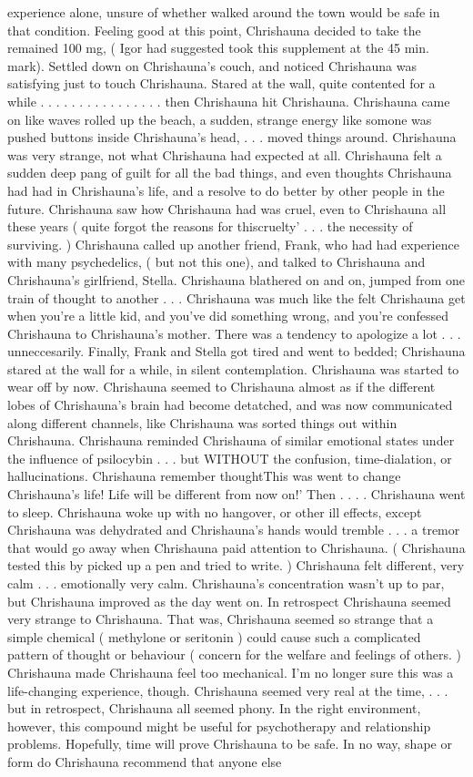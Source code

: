 \documentclass[12pt]{book}
\begin{document}
experience alone, unsure of whether walked around the town would be safe in that condition. Feeling good at this point, Chrishauna decided to take the remained 100 mg, ( Igor had suggested took this supplement at the 45 min. mark). Settled down on Chrishauna's couch, and noticed Chrishauna was satisfying just to touch Chrishauna. Stared at the wall, quite contented for a while . . .   . . .   . . .   . . .   . . .  . then Chrishauna hit Chrishauna. Chrishauna came on like waves rolled up the beach, a sudden, strange energy like somone was pushed buttons inside Chrishauna's head, . . .  moved things around. Chrishauna was very strange, not what Chrishauna had expected at all. Chrishauna felt a sudden deep pang of guilt for all the bad things, and even thoughts Chrishauna had had in Chrishauna's life, and a resolve to do better by other people in the future. Chrishauna saw how Chrishauna had was cruel, even to Chrishauna all these years ( quite forgot the reasons for thiscruelty' . . .  the necessity of surviving. ) Chrishauna called up another friend, Frank, who had had experience with many psychedelics, ( but not this one), and talked to Chrishauna and Chrishauna's girlfriend, Stella. Chrishauna blathered on and on, jumped from one train of thought to another . . .  Chrishauna was much like the felt Chrishauna get when you're a little kid, and you've did something wrong, and you're confessed Chrishauna to Chrishauna's mother. There was a tendency to apologize a lot . . .  unneccesarily. Finally, Frank and Stella got tired and went to bedded; Chrishauna stared at the wall for a while, in silent contemplation. Chrishauna was started to wear off by now. Chrishauna seemed to Chrishauna almost as if the different lobes of Chrishauna's brain had become detatched, and was now communicated along different channels, like Chrishauna was sorted things out within Chrishauna. Chrishauna reminded Chrishauna of similar emotional states under the influence of psilocybin . . .  but WITHOUT the confusion, time-dialation, or hallucinations. Chrishauna remember thoughtThis was went to change Chrishauna's life! Life will be different from now on!' Then . . .  . Chrishauna went to sleep. Chrishauna woke up with no hangover, or other ill effects, except Chrishauna was dehydrated and Chrishauna's hands would tremble . . .  a tremor that would go away when Chrishauna paid attention to Chrishauna. ( Chrishauna tested this by picked up a pen and tried to write. ) Chrishauna felt different, very calm . . .  emotionally very calm. Chrishauna's concentration wasn't up to par, but Chrishauna improved as the day went on. In retrospect Chrishauna seemed very strange to Chrishauna. That was, Chrishauna seemed so strange that a simple chemical ( methylone or seritonin ) could cause such a complicated pattern of thought or behaviour ( concern for the welfare and feelings of others. ) Chrishauna made Chrishauna feel too mechanical. I'm no longer sure this was a life-changing experience, though. Chrishauna seemed very real at the time, . . .  but in retrospect, Chrishauna all seemed phony. In the right environment, however, this compound might be useful for psychotherapy and relationship problems. Hopefully, time will prove Chrishauna to be safe. In no way, shape or form do Chrishauna recommend that anyone else 
\end{document}
